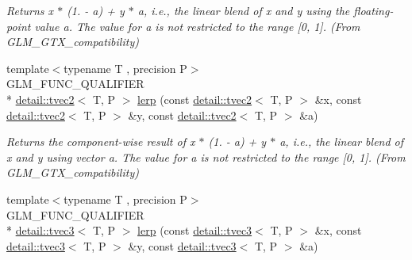 \begin{DoxyCompactItemize}
\begin{DoxyCompactList}\small\item\em Returns x $\ast$ (1. -\/ a) + y $\ast$ a, i.\-e., the linear blend of x and y using the floating-\/point value a. The value for a is not restricted to the range \mbox{[}0, 1\mbox{]}. (From G\-L\-M\-\_\-\-G\-T\-X\-\_\-compatibility) \end{DoxyCompactList}\item 
\hypertarget{group__gtx__compatibility_ga9cc12766a2675ce054a30b0cab4b567b}{{\footnotesize template$<$typename T , precision P$>$ }\\G\-L\-M\-\_\-\-F\-U\-N\-C\-\_\-\-Q\-U\-A\-L\-I\-F\-I\-E\-R \\*
\hyperlink{structglm_1_1detail_1_1tvec2}{detail\-::tvec2}$<$ T, P $>$ \hyperlink{group__gtx__compatibility_ga9cc12766a2675ce054a30b0cab4b567b}{lerp} (const \hyperlink{structglm_1_1detail_1_1tvec2}{detail\-::tvec2}$<$ T, P $>$ \&x, const \hyperlink{structglm_1_1detail_1_1tvec2}{detail\-::tvec2}$<$ T, P $>$ \&y, const \hyperlink{structglm_1_1detail_1_1tvec2}{detail\-::tvec2}$<$ T, P $>$ \&a)}\label{group__gtx__compatibility_ga9cc12766a2675ce054a30b0cab4b567b}

\begin{DoxyCompactList}\small\item\em Returns the component-\/wise result of x $\ast$ (1. -\/ a) + y $\ast$ a, i.\-e., the linear blend of x and y using vector a. The value for a is not restricted to the range \mbox{[}0, 1\mbox{]}. (From G\-L\-M\-\_\-\-G\-T\-X\-\_\-compatibility) \end{DoxyCompactList}\item 
\hypertarget{group__gtx__compatibility_gaa07546447a0138988802c82cf38aa53d}{{\footnotesize template$<$typename T , precision P$>$ }\\G\-L\-M\-\_\-\-F\-U\-N\-C\-\_\-\-Q\-U\-A\-L\-I\-F\-I\-E\-R \\*
\hyperlink{structglm_1_1detail_1_1tvec3}{detail\-::tvec3}$<$ T, P $>$ \hyperlink{group__gtx__compatibility_gaa07546447a0138988802c82cf38aa53d}{lerp} (const \hyperlink{structglm_1_1detail_1_1tvec3}{detail\-::tvec3}$<$ T, P $>$ \&x, const \hyperlink{structglm_1_1detail_1_1tvec3}{detail\-::tvec3}$<$ T, P $>$ \&y, const \hyperlink{structglm_1_1detail_1_1tvec3}{detail\-::tvec3}$<$ T, P $>$ \&a)}\label{group__gtx__compatibility_gaa07546447a0138988802c82cf38aa53d}


\end{DoxyCompactItemize}
